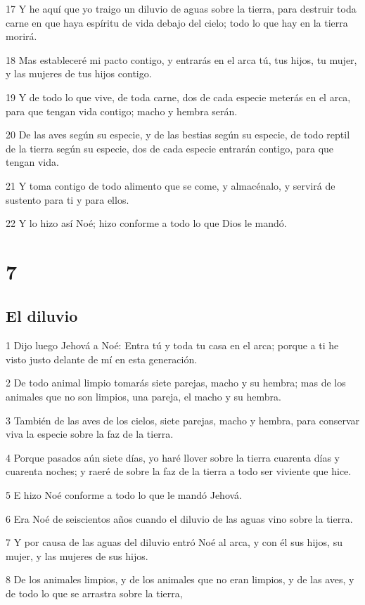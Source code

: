 17 Y he aquí que yo traigo un diluvio de aguas sobre la tierra, para destruir toda carne en que haya espíritu de vida debajo del cielo; todo lo que hay en la tierra morirá.

18 Mas estableceré mi pacto contigo, y entrarás en el arca tú, tus hijos, tu mujer, y las mujeres de tus hijos contigo.

19 Y de todo lo que vive, de toda carne, dos de cada especie meterás en el arca, para que tengan vida contigo; macho y hembra serán.

20 De las aves según su especie, y de las bestias según su especie, de todo reptil de la tierra según su especie, dos de cada especie entrarán contigo, para que tengan vida.

21 Y toma contigo de todo alimento que se come, y almacénalo, y servirá de sustento para ti y para ellos.

22 Y lo hizo así Noé; hizo conforme a todo lo que Dios le mandó.

\chapter{7}

\section{El diluvio}

1 Dijo luego Jehová a Noé: Entra tú y toda tu casa en el arca; porque a ti he visto justo delante de mí en esta generación.

2 De todo animal limpio tomarás siete parejas, macho y su hembra; mas de los animales que no son limpios, una pareja, el macho y su hembra.

3 También de las aves de los cielos, siete parejas, macho y hembra, para conservar viva la especie sobre la faz de la tierra.

4 Porque pasados aún siete días, yo haré llover sobre la tierra cuarenta días y cuarenta noches; y raeré de sobre la faz de la tierra a todo ser viviente que hice.

5 E hizo Noé conforme a todo lo que le mandó Jehová.

6 Era Noé de seiscientos años cuando el diluvio de las aguas vino sobre la tierra.

7 Y por causa de las aguas del diluvio entró Noé al arca, y con él sus hijos, su mujer, y las mujeres de sus hijos.

8 De los animales limpios, y de los animales que no eran limpios, y de las aves, y de todo lo que se arrastra sobre la tierra,

